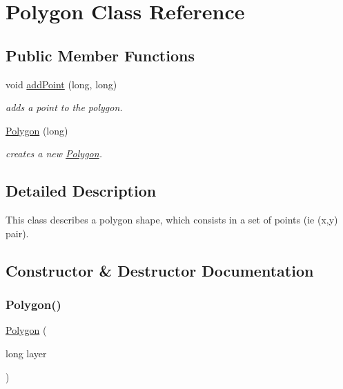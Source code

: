 \hypertarget{class_c_i_f_1_1_polygon}{}\section{Polygon Class Reference}
\label{class_c_i_f_1_1_polygon}
\subsection*{Public Member Functions}
\begin{DoxyCompactItemize}
\item 
void \hyperlink{class_c_i_f_1_1_polygon_ab3047469780327f18539907e1303ea15}{add\+Point} (long, long)
\begin{DoxyCompactList}\small\item\em adds a point to the polygon. \end{DoxyCompactList}\item 
\hyperlink{class_c_i_f_1_1_polygon_a07683a8a7dea6f09aba6997cc99fff5a}{Polygon} (long)
\begin{DoxyCompactList}\small\item\em creates a new \hyperlink{class_c_i_f_1_1_polygon}{Polygon}. \end{DoxyCompactList}\end{DoxyCompactItemize}


\subsection{Detailed Description}
This class describes a polygon shape, which consists in a set of points (ie (x,y) pair). 

\subsection{Constructor \& Destructor Documentation}
\mbox{\label{class_c_i_f_1_1_polygon_a07683a8a7dea6f09aba6997cc99fff5a}} 
\subsubsection{\texorpdfstring{Polygon()}{Polygon()}}
{\footnotesize\ttfamily \hyperlink{class_c_i_f_1_1_polygon}{Polygon} (\begin{DoxyParamCaption}\item[{long}]{layer }\end{DoxyParamCaption})}



